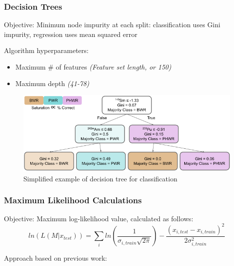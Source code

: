 \begin{frame}
  \frametitle{Decision Trees}
  \begin{adjustwidth}{-10pt}{-10pt}
  \vspace{-12pt}
  \begin{minipage}[t]{0.51\textwidth}
    \begin{block}{Objective:}
      Minimum node impurity at each split: classification uses Gini impurity,
      regression uses mean squared error
    \end{block}
  \end{minipage}%
  \hfill
  \begin{minipage}[t]{0.51\textwidth}
    \begin{block}{Algorithm hyperparameters:}
      \begin{itemize}
        \item Maximum \# of features \textit{(Feature set length, or 150)}
        \item Maximum depth \textit{(41-78)}
      \end{itemize}
    \end{block}
  \end{minipage}
    \begin{figure}
      \centering
      \includegraphics[width=1.05\textwidth]{./figures/dtree.png}
      Simplified example of decision tree for classification
    \end{figure}
  \end{adjustwidth}
\end{frame}

\begin{frame}
  \frametitle{Maximum Likelihood Calculations}
  \begin{block}{Objective:}
    Maximum log-likelihood value, calculated as follows:
    \[
      ln(L(M|x_{test})) = \sum_i ln(\frac{1}{\sigma_{i,train} \sqrt{2\pi}}) - 
                          \frac{(x_{i,test} - x_{i,train})^2}{2 \sigma_{i,train}^2}
    \]  
  \end{block}
  Approach based on previous work: \cite{mll_method}

\end{frame}
